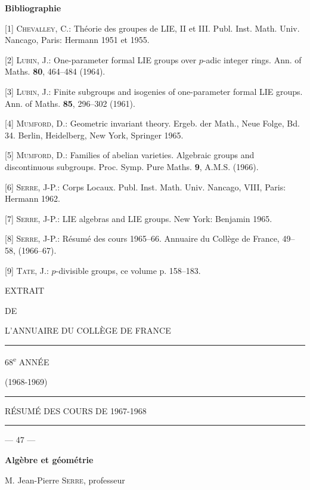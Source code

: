 \begin{center}\textbf{Bibliographie}\end{center}

[1] \textsc{Chevalley}, C.: Théorie des groupes de LIE, II et III. Publ. Inst. Math. Univ. Nancago, Paris: Hermann 1951 et 1955.

[2] \textsc{Lubin}, J.: One-parameter formal LIE groups over $p$-adic integer rings. Ann. of Maths. \textbf{80}, 464--484 (1964).

[3] \textsc{Lubin}, J.: Finite subgroups and isogenies of one-parameter formal LIE groups. Ann. of Maths. \textbf{85}, 296--302 (1961).

[4] \textsc{Mumford}, D.: Geometric invariant theory. Ergeb. der Math., Neue Folge, Bd. 34. Berlin, Heidelberg, New York, Springer 1965.

[5] \textsc{Mumford}, D.: Families of abelian varieties. Algebraic groups and discontinuous subgroups. Proc. Symp. Pure Maths. \textbf{9}, A.M.S. (1966).

[6] \textsc{Serre}, J-P.: Corps Locaux. Publ. Inst. Math. Univ. Nancago, VIII, Paris: Hermann 1962.

[7] \textsc{Serre}, J-P.: LIE algebras and LIE groups. New York: Benjamin 1965.

[8] \textsc{Serre}, J-P.: Résumé des cours 1965--66. Annuaire du Collège de France, 49--58, (1966--67).

[9] \textsc{Tate}, J.: $p$-divisible groups, ce volume p. 158--183.

\begin{center}
EXTRAIT

DE

L'ANNUAIRE DU COLLÈGE DE FRANCE

\rule{1.1cm}{.4pt}

68\textsuperscript{e} ANNÉE

(1968-1969)

\rule{1.1cm}{.4pt}

RÉSUMÉ DES COURS DE 1967-1968

\rule{1.6cm}{.4pt}
\end{center}

\begin{center}--- 47 ---\end{center}

\begin{center}\textbf{Algèbre et géométrie}

M. Jean-Pierre \textsc{Serre}, professeur\end{center}

